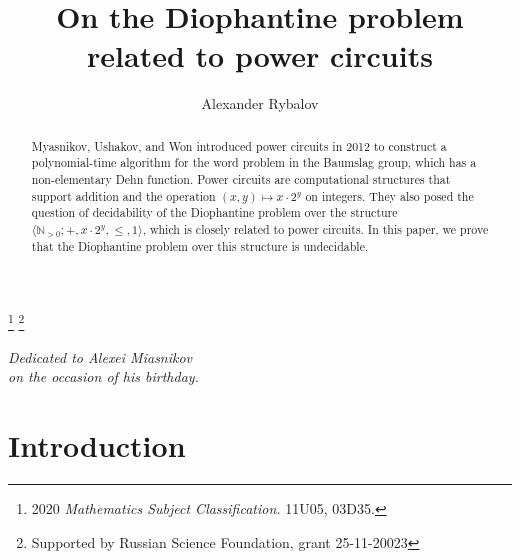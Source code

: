 \documentclass{jgcc} %
\theoremstyle{plain}\newtheorem{satz}[thm]{Satz} %
\begin{document}
\title[On the Diophantine problem related to power circuits]{On the Diophantine problem related to power circuits}

\author[A.~Rybalov]{Alexander Rybalov}
\address{Sobolev Institute of Mathematics, Pevtsova 13, Omsk 644099, Russia.}	%
\thanks{2020 \textit{Mathematics Subject Classification.} 11U05, 03D35.} 
\thanks{Supported by Russian Science Foundation, grant 25-11-20023}	%





\begin{abstract}
  \noindent Myasnikov, Ushakov, and Won introduced power circuits in 2012 to 
construct a polynomial-time algorithm for the word
problem in the Baumslag group, which has a non-elementary Dehn function.
Power circuits are computational
structures that support addition and the operation
$(x,y) \mapsto x \cdot 2^y$ on integers.
They also posed the question of decidability of the
Diophantine problem over the structure
$\langle \mathbb{N}_{>0}; +, x \cdot 2^y, \leq, 1 \rangle$,
which is closely related to power circuits.
In this paper, we prove that the Diophantine problem over this structure is undecidable.
\end{abstract}

\maketitle

\begin{flushright}
{\it Dedicated to Alexei Miasnikov\\
on the occasion of his birthday.}
\end{flushright}

\section{Introduction}
\end{document}
